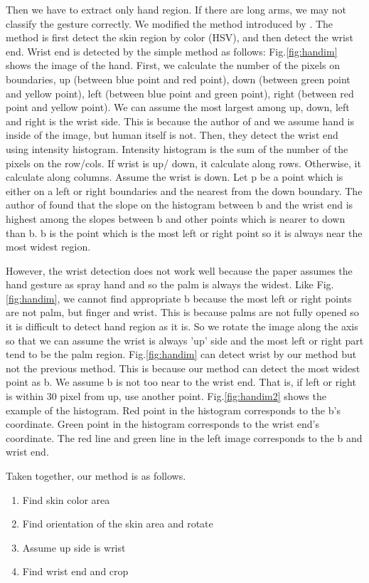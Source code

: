 Then we have to extract only hand region. If there are long arms, we may not classify the gesture correctly. We modified the method introduced by \cite{ra11}. The method is first detect the skin region by color (HSV), and then detect the wrist end. Wrist end is detected by the simple method as follows:
Fig.\ref{fig:handim} shows the image of the hand. 
First, we calculate the number of the pixels on boundaries, 
up (between blue point and red point), 
down (between green point and yellow point), left (between blue point and green point), right (between red point and yellow point). 
We can assume the most largest among up, down, left and right is the wrist side. This is because the author of \cite{ra11} and we assume hand is inside of the image, but human itself is not. 
Then, they detect the wrist end using intensity histogram. Intensity histogram is the sum of the number of the pixels on the row/cols. If wrist is up/ down, it calculate along rows. Otherwise, it calculate along columns.
Assume the wrist is down. Let p be a point which is either on a left or right boundaries and the nearest from the down boundary. The author of \cite{ra11} found that the slope on the histogram between b and the wrist end is highest among the slopes between b and other points which is nearer to down than b. b is the point which is the most left or right point so it is always near the most widest region.
\par
However, the wrist detection does not work well because the paper assumes the hand gesture as spray hand and so the palm is always the widest. Like Fig.\ref{fig:handim}, we cannot find appropriate b because the most left or right points are not palm, but finger and wrist.
This is because palms are not fully opened so it is difficult to detect hand region as it is. 
So we rotate the image along the axis so that we can assume the wrist is always 'up' side and the most left or right part tend to be the palm region.
Fig.\ref{fig:handim}  can detect wrist by our method but not the previous method. This is because our method can detect the most widest point as b. 
We assume b is not too near to the wrist end. That is, if left or right is within 30 pixel from up, use another point.
Fig.\ref{fig:handim2} shows the example of the histogram. Red point in the histogram corresponds to the b's coordinate. Green point in the histogram corresponds to the wrist end's coordinate. The red line and green line in the left image corresponds to the b and wrist end.

Taken together, our method is as follows.
\begin{enumerate}
  \item Find skin color area
  \item Find orientation of the skin area and rotate
  \item Assume up side is wrist
  \item Find wrist end and crop
\end{enumerate}

